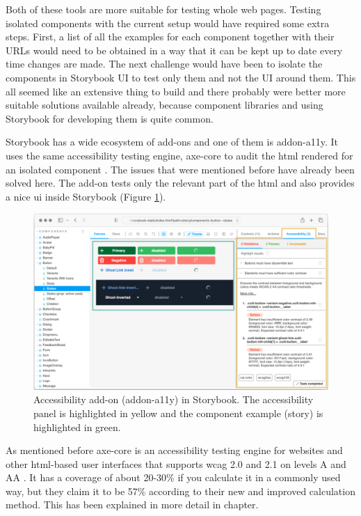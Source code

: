 \documentclass{master_thesis}
\begin{document}
Both of these tools are more suitable for testing whole web pages. Testing isolated components with the current setup would have required some extra steps. First, a list of all the examples for each component together with their URLs would need to be obtained in a way that it can be kept up to date every time changes are made. The next challenge would have been to isolate the components in Storybook UI to test only them and not the UI around them. This all seemed like an extensive thing to build and there probably were better more suitable solutions available already, because component libraries and using Storybook for developing them is quite common.

Storybook has a wide ecosystem of add-ons and one of them is addon-a11y. It uses the same accessibility testing engine, axe-core to audit the \ac{html} rendered for an isolated component \citep{addon-a11y}. The issues that were mentioned before have already been solved here. The add-on tests only the relevant part of the \ac{html} and also provides a nice \ac{ui} inside Storybook (Figure \ref{fig:addon-a11y}).

\begin{figure}[h]
	\includegraphics[width=\textwidth]{img/addon-a11y.png}
	\caption{Accessibility add-on (addon-a11y) in Storybook. The accessibility panel is highlighted in yellow and the component example (story) is highlighted in green.}
	\label{fig:addon-a11y}
\end{figure}

As mentioned before axe-core is an accessibility testing engine for websites and other \ac{html}-based user interfaces that supports \ac{wcag} 2.0 and 2.1 on levels A and AA \citep{Deque2023}. It has a coverage of about 20-30\% if you calculate it in a commonly used way, but they claim it to be 57\% according to their new and improved calculation method. This has been explained in more detail in  chapter.
\end{document}

